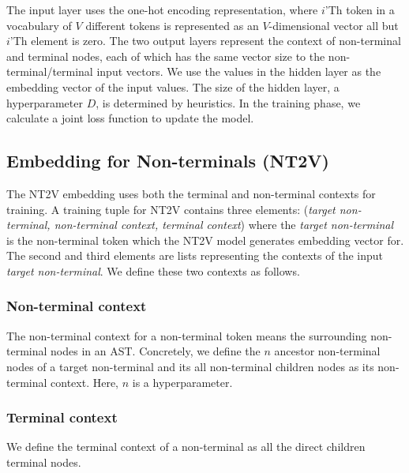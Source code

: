 \documentclass[E]{compsoft}
\begin{document}
The input layer uses the one-hot encoding representation, where $i$'Th token in a vocabulary of $V$ different tokens is represented as an $V$-dimensional vector all but $i$'Th element is zero.  
The two output layers represent the context of non-terminal and terminal nodes, each of which has the same vector size to the non-terminal/terminal input vectors.
We use the values in the hidden layer as the embedding vector of the input values.  The size of the hidden layer, a hyperparameter $D$, is determined by heuristics.
In the training phase, we calculate a joint loss function to update the model.




\subsection{Embedding for Non-terminals (NT2V)}
\label{sub:embedding_nt}
The NT2V embedding uses both the terminal and non-terminal contexts for training.
A training tuple for NT2V contains three elements: (\textit{target non-terminal, non-terminal context, terminal context}) where the \textit{target non-terminal} is the non-terminal token which the NT2V model generates embedding vector for. 
The second and third elements are lists representing the contexts of the input \textit{target non-terminal}.
We define these two contexts as follows.

\subsubsection{Non-terminal context}
The non-terminal context for a non-terminal token means the surrounding non-terminal nodes in an AST. 
Concretely, we define the $n$ ancestor non-terminal nodes of a target non-terminal and its all non-terminal children nodes as its non-terminal context.
Here, $n$ is a hyperparameter. 

\subsubsection{Terminal context} 
We define the terminal context of a non-terminal as all the direct children terminal nodes. 
\end{document}
